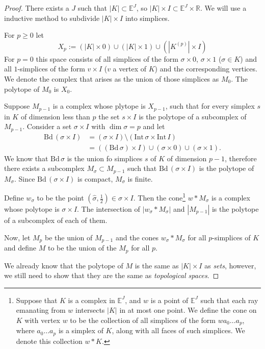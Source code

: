 \documentclass[draft,toc=bib]{scrartcl}
\theoremstyle{plain}
\theoremstyle{definition}
\theoremstyle{remark}
\newcommand{\Bd}{\mathrm{Bd}\,}
\newcommand{\Int}{\mathrm{Int}\,}
\begin{document}
\begin{proof}
	There exists a $J$ such that $|K|\subset \mathbb{E}^J$, so $|K|\times I\subset \mathbb{E}^J\times \mathbb{R}$. We will use a inductive method to subdivide $|K|\times I$ into simplices.
	
	For $p\geq 0$ let
	\[
	X_p:=(|K|\times 0)\cup (|K|\times 1)\cup(|K^{(p)}|\times I)
	\]
	For $p=0$ this space consists of all simplices of the form $\sigma\times 0$, $\sigma \times 1$ ($\sigma\in K$) and all $1$-simplices of the form $v\times I$ ($v$ a vertex of $K$) and the corresponding vertices. We denote the complex that arises as the union of those simplices as $M_0$. The polytope of $M_0$ is $X_0$.
	
	Suppose $M_{p-1}$ is a complex whose plytope is $X_{p-1}$, such that for every simplex $s$ in $K$ of dimension less than $p$ the set $s\times I$ is the polytope of a subcomplex of $M_{p-1}$. Consider a set $\sigma\times I$ with $\dim\sigma=p$ and let
	\begin{align*}
	\Bd(\sigma\times I)&=(\sigma\times I)\setminus(\Int \sigma\times \Int I)\\
	&=((\Bd \sigma)\times I)\cup (\sigma\times 0)\cup (\sigma\times 1).
	\end{align*}
	We know that $\Bd \sigma$ is the union fo simplices $s$ of $K$ of dimension $p-1$, therefore there exists a subcomplex $M_\sigma\subset M_{p-1}$ such that $\Bd (\sigma\times I)$ is the polytope of $M_\sigma$. Since $\Bd (\sigma\times I)$ is compact, $M_\sigma$ is finite.
	
	Define $w_\sigma$ to be the point $(\hat{\sigma},\frac{1}{2})\in \sigma\times I$. Then the cone\footnote{Suppose that $K$ is a complex in $\mathbb{E}^J$, and $w$ is a point of $\mathbb{E}^J$ such that each ray emanating from $w$ intersects $|K|$ in at most one point. We define the cone on $K$ with vertex $w$ to be the collection of all simplices of the form $wa_0\dots a_p$, where $a_0\dots a_p$ is a simplex of $K$, along with all faces of such simplices. We denote this collection $w\ast K$.\cite[p. 44]{mu}} $w\ast M_\sigma$ is a complex whose polytope is $\sigma\times I$. The intersection of $|w_\sigma\ast M_\sigma|$ and $|M_{p-1}|$ is the polytope of a subcomplex of each of them.
	
	Now, let $M_p$ be the union of $M_{p-1}$ and the cones $w_\sigma\ast M_\sigma$ for all $p$-simplices of $K$ and define $M$ to be the union of the $M_p$ for all $p$.
	
	We already know that the polytope of $M$ is the same as $|K|\times I$ as \emph{sets}, however, we still need to show that they are the same as \emph{topological spaces}.
	

\end{proof}
\end{document}
